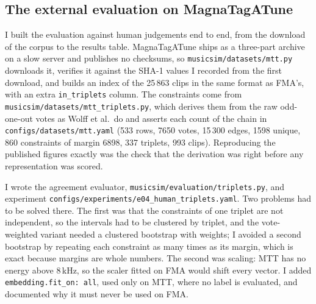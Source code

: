 
\subsection{The external evaluation on MagnaTagATune}

I built the evaluation against human judgements end to end, from the download
of the corpus to the results table. MagnaTagATune \cite{Law2009} ships as a
three-part archive on a slow server and publishes no checksums, so
\texttt{musicsim/\allowbreak datasets/\allowbreak mtt.py} downloads it, verifies it against the SHA-1
values I recorded from the first download, and builds an index of the 25\,863
clips in the same format as FMA's, with an extra \texttt{in\_triplets} column.
The constraints come from \texttt{musicsim/\allowbreak datasets/\allowbreak mtt\_triplets.py}, which
derives them from the raw odd-one-out votes as Wolff et al.\ do
\cite{Wolff2012} and asserts each count of the chain in
\texttt{configs/datasets/mtt.yaml} (533 rows, 7650 votes, 15\,300 edges, 1598
unique, 860 constraints of margin 6898, 337 triplets, 993 clips). Reproducing
the published figures exactly was the check that the derivation was right
before any representation was scored.

I wrote the agreement evaluator, \texttt{musicsim/\allowbreak evaluation/\allowbreak triplets.py}, and
experiment \texttt{configs/\allowbreak experiments/\allowbreak e04\_human\_triplets.yaml}. Two problems
had to be solved there. The first was that the constraints of one triplet are
not independent, so the intervals had to be clustered by triplet, and the
vote-weighted variant needed a clustered bootstrap with weights; I avoided a
second bootstrap by repeating each constraint as many times as its margin,
which is exact because margins are whole numbers. The second was scaling: MTT
has no energy above 8\,kHz, so the scaler fitted on FMA would shift every
vector. I added \texttt{embedding.fit\_on: all}, used only on MTT, where no
label is evaluated, and documented why it must never be used on FMA.

